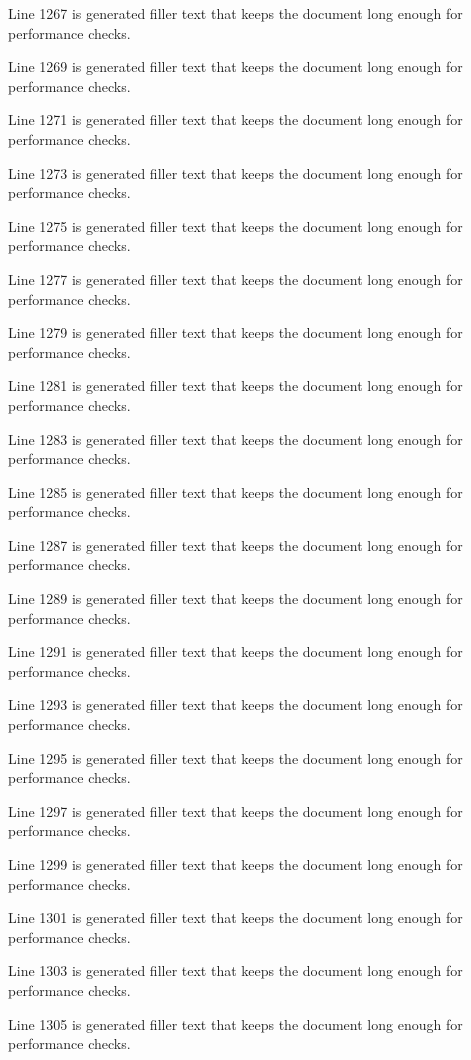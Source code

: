 Line 1267 is generated filler text that keeps the document long enough for performance checks.

Line 1269 is generated filler text that keeps the document long enough for performance checks.

Line 1271 is generated filler text that keeps the document long enough for performance checks.

Line 1273 is generated filler text that keeps the document long enough for performance checks.

Line 1275 is generated filler text that keeps the document long enough for performance checks.

Line 1277 is generated filler text that keeps the document long enough for performance checks.

Line 1279 is generated filler text that keeps the document long enough for performance checks.

Line 1281 is generated filler text that keeps the document long enough for performance checks.

Line 1283 is generated filler text that keeps the document long enough for performance checks.

Line 1285 is generated filler text that keeps the document long enough for performance checks.

Line 1287 is generated filler text that keeps the document long enough for performance checks.

Line 1289 is generated filler text that keeps the document long enough for performance checks.

Line 1291 is generated filler text that keeps the document long enough for performance checks.

Line 1293 is generated filler text that keeps the document long enough for performance checks.

Line 1295 is generated filler text that keeps the document long enough for performance checks.

Line 1297 is generated filler text that keeps the document long enough for performance checks.

Line 1299 is generated filler text that keeps the document long enough for performance checks.

Line 1301 is generated filler text that keeps the document long enough for performance checks.

Line 1303 is generated filler text that keeps the document long enough for performance checks.

Line 1305 is generated filler text that keeps the document long enough for performance checks.

